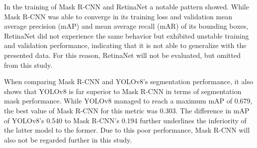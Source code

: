 \documentclass[draft,final]{vutinfth} %
\begin{document}
In the training of Mask R-CNN and RetinaNet a notable pattern showed. While Mask R-CNN was able to converge in its training loss and validation mean average precision (mAP) and mean average recall (mAR) of its bounding boxes, RetinaNet did not experience the same behavior but exhibited unstable training and validation performance, indicating that it is not able to generalize with the presented data. For this reason, RetinaNet will not be evaluated, but omitted from this study. 

When comparing Mask R-CNN and YOLOv8's segmentation performance, it also shows that YOLOv8 is far superior to Mask R-CNN in terms of segmentation mask performance. While YOLOv8 managed to reach a maximum mAP of 0.679, the best value of Mask R-CNN for this metric was 0.303. The difference in mAP of YOLOv8's 0.540 to Mask R-CNN's 0.194 further underlines the inferiority of the latter model to the former. Due to this poor performance, Mask R-CNN will also not be regarded further in this study.
\end{document}
